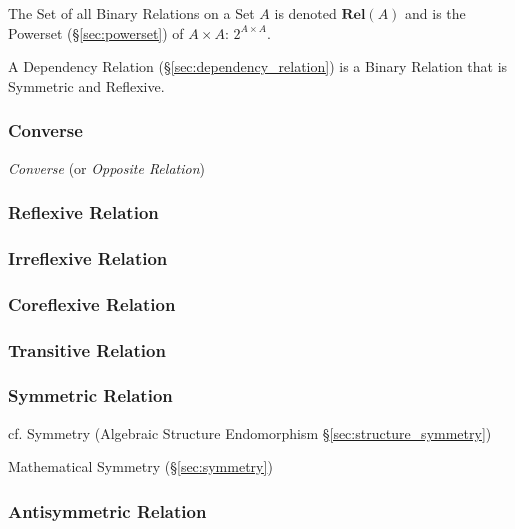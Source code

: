 The Set of all Binary Relations on a Set $A$ is denoted
$\mathbf{Rel}(A)$ and is the Powerset (\S\ref{sec:powerset}) of $A
\times A$: $2^{A \times A}$.

A Dependency Relation (\S\ref{sec:dependency_relation}) is a Binary
Relation that is Symmetric and Reflexive.



\subsubsection{Converse}\label{sec:converse}

\emph{Converse} (or \emph{Opposite Relation})



\subsubsection{Reflexive Relation}\label{sec:reflexive_relation}

\subsubsection{Irreflexive Relation}\label{sec:irreflexive_relation}

\subsubsection{Coreflexive Relation}\label{sec:coreflexive_relation}

\subsubsection{Transitive Relation}\label{sec:transitive_relation}

\subsubsection{Symmetric Relation}\label{sec:symmetric_relation}

\fist cf. Symmetry (Algebraic Structure Endomorphism
\S\ref{sec:structure_symmetry})

\fist Mathematical Symmetry (\S\ref{sec:symmetry})



\subsubsection{Antisymmetric Relation}\label{sec:antisymmetric_relation}

